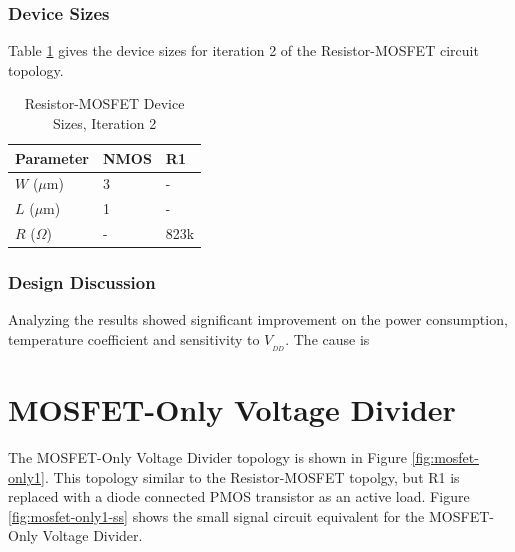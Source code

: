\documentclass[conference]{IEEEtran}
\begin{document}
\subsubsection{Device Sizes}
Table \ref{tab:rm-ds-2} gives the device sizes for iteration 2 of the Resistor-MOSFET circuit topology. 
\begin{table}[!htbp]
  \caption[]{Resistor-MOSFET Device Sizes, Iteration 2}
  \label{tab:rm-ds-2}
  \centering
  \begin{tabular}{|l|l|l|}
    \hline
    Parameter			& NMOS	&R1 \\ \hline
    $W$ ($\mu$m)		&3		&-\\ 
    $L$ ($\mu$m)		& 1		&-\\
    $R$ ($\Omega$)		&-		&823k\\
    \hline
  \end{tabular}
\end{table}
\subsubsection{Design Discussion}
Analyzing the results showed significant improvement on the power consumption, temperature coefficient and sensitivity to $V_{_{DD}}$.  The cause is 
\pagebreak
\section{MOSFET-Only Voltage Divider}
The MOSFET-Only Voltage Divider topology is shown in Figure \ref{fig:mosfet-only1}.  This topology similar to the Resistor-MOSFET topolgy, but R1 is replaced with a diode connected PMOS transistor as an active load.  Figure \ref{fig:mosfet-only1-ss} shows the small signal circuit equivalent for the MOSFET-Only Voltage Divider.
\end{document}
